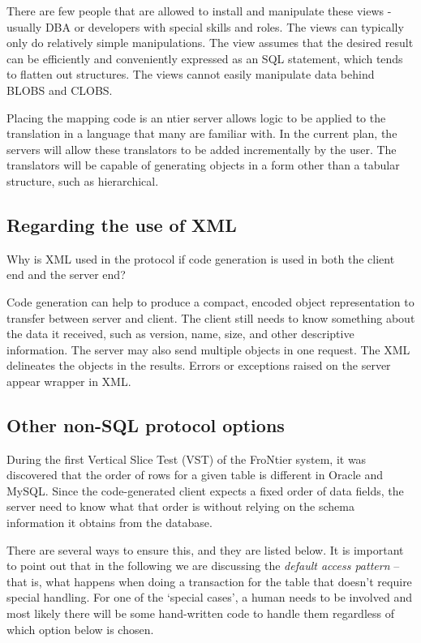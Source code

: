 There are few people that are allowed to install and manipulate these
views - usually DBA or developers with special skills and roles. The
views can typically only do relatively simple manipulations. The view
assumes that the desired result can be efficiently and conveniently
expressed as an SQL statement, which tends to flatten out
structures. The views cannot easily manipulate data behind BLOBS and
CLOBS.

Placing the mapping code is an ntier server allows logic to be applied
to the translation in a language that many are familiar with. In the
current plan, the servers will allow these translators to be added
incrementally by the user. The translators will be capable of
generating objects in a form other than a tabular structure, such as
hierarchical.

\subsection{Regarding the use of XML}

Why is XML used in the protocol if code generation is used in both the
client end and the server end?

Code generation can help to produce a compact, encoded object
representation to transfer between server and client. The client still
needs to know something about the data it received, such as version,
name, size, and other descriptive information. The server may also
send multiple objects in one request. The XML delineates the objects
in the results. Errors or exceptions raised on the server appear
wrapper in XML.



\subsection{Other non-SQL protocol options}
\label{sec:reqs_other_protocol_options}

During the first Vertical Slice Test (VST) of the FroNtier system,
it was discovered that the order of rows for a given table is
different in Oracle and MySQL.  Since the code-generated client
expects a fixed order of data fields, the server need to know what
that order is without relying on the schema information it obtains
from the database.

There are several ways to ensure this, and they are listed below.
It is important to point out that in the following we are discussing
the \emph{default access pattern} -- that is, what happens when
doing a transaction for the table that doesn't require special
handling.  For one of the `special cases', a human needs to be
involved and most likely there will be some hand-written code
to handle them regardless of which option below is chosen.

